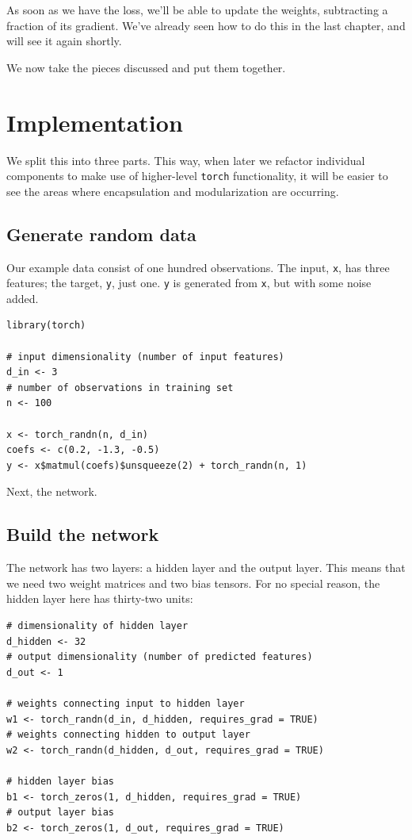 \documentclass[
  letterpaper,
]{krantz}
\begin{document}
As soon as we have the loss, we'll be able to update the weights,
subtracting a fraction of its gradient. We've already seen how to do
this in the last chapter, and will see it again shortly.

We now take the pieces discussed and put them together.

\hypertarget{implementation}{%
\section{Implementation}\label{implementation}}

We split this into three parts. This way, when later we refactor
individual components to make use of higher-level \texttt{torch}
functionality, it will be easier to see the areas where encapsulation
and modularization are occurring.

\hypertarget{generate-random-data}{%
\subsection{Generate random data}\label{generate-random-data}}

Our example data consist of one hundred observations. The input,
\texttt{x}, has three features; the target, \texttt{y}, just one.
\texttt{y} is generated from \texttt{x}, but with some noise added.

\begin{verbatim}
library(torch)

# input dimensionality (number of input features)
d_in <- 3
# number of observations in training set
n <- 100

x <- torch_randn(n, d_in)
coefs <- c(0.2, -1.3, -0.5)
y <- x$matmul(coefs)$unsqueeze(2) + torch_randn(n, 1)
\end{verbatim}

Next, the network.

\hypertarget{build-the-network}{%
\subsection{\texorpdfstring{Build the
network}{Build the network}}\label{build-the-network}}

The network has two layers: a hidden layer and the output layer. This
means that we need two weight matrices and two bias tensors. For no
special reason, the hidden layer here has thirty-two units:

\begin{verbatim}
# dimensionality of hidden layer
d_hidden <- 32
# output dimensionality (number of predicted features)
d_out <- 1

# weights connecting input to hidden layer
w1 <- torch_randn(d_in, d_hidden, requires_grad = TRUE)
# weights connecting hidden to output layer
w2 <- torch_randn(d_hidden, d_out, requires_grad = TRUE)

# hidden layer bias
b1 <- torch_zeros(1, d_hidden, requires_grad = TRUE)
# output layer bias
b2 <- torch_zeros(1, d_out, requires_grad = TRUE)
\end{verbatim}
\end{document}
